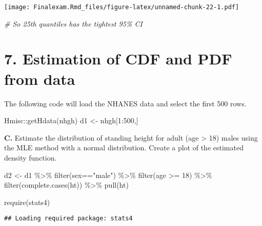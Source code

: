 \documentclass[
]{article}
\newenvironment{Shaded}{\begin{snugshade}}{\end{snugshade}}
\newcommand{\CommentTok}[1]{\textcolor[rgb]{0.56,0.35,0.01}{\textit{#1}}}
\newcommand{\DecValTok}[1]{\textcolor[rgb]{0.00,0.00,0.81}{#1}}
\newcommand{\FunctionTok}[1]{\textcolor[rgb]{0.00,0.00,0.00}{#1}}
\newcommand{\NormalTok}[1]{#1}
\newcommand{\OtherTok}[1]{\textcolor[rgb]{0.56,0.35,0.01}{#1}}
\newcommand{\SpecialCharTok}[1]{\textcolor[rgb]{0.00,0.00,0.00}{#1}}
\newcommand{\StringTok}[1]{\textcolor[rgb]{0.31,0.60,0.02}{#1}}
\begin{document}
\texttt{[image: Finalexam.Rmd\_files/figure-latex/unnamed-chunk-22-1.pdf]}

\begin{Shaded}
\begin{Highlighting}[]
\CommentTok{\# So 25th quantiles has the tightest 95\% CI}
\end{Highlighting}
\end{Shaded}

\hypertarget{estimation-of-cdf-and-pdf-from-data}{%
\section{7. Estimation of CDF and PDF from
data}\label{estimation-of-cdf-and-pdf-from-data}}

The following code will load the NHANES data and select the first 500
rows.

\begin{Shaded}
\begin{Highlighting}[]
\NormalTok{Hmisc}\SpecialCharTok{::}\FunctionTok{getHdata}\NormalTok{(nhgh)}
\NormalTok{d1 }\OtherTok{\textless{}{-}}\NormalTok{ nhgh[}\DecValTok{1}\SpecialCharTok{:}\DecValTok{500}\NormalTok{,]}
\end{Highlighting}
\end{Shaded}

\textbf{C.} Estimate the distribution of standing height for adult (age
\textgreater{} 18) males using the MLE method with a normal
distribution. Create a plot of the estimated density function.

\begin{Shaded}
\begin{Highlighting}[]
\NormalTok{d2 }\OtherTok{\textless{}{-}}\NormalTok{ d1 }\SpecialCharTok{\%\textgreater{}\%} 
  \FunctionTok{filter}\NormalTok{(sex}\SpecialCharTok{==}\StringTok{"male"}\NormalTok{) }\SpecialCharTok{\%\textgreater{}\%} 
  \FunctionTok{filter}\NormalTok{(age }\SpecialCharTok{\textgreater{}=} \DecValTok{18}\NormalTok{) }\SpecialCharTok{\%\textgreater{}\%} 
  \FunctionTok{filter}\NormalTok{(}\FunctionTok{complete.cases}\NormalTok{(ht)) }\SpecialCharTok{\%\textgreater{}\%} 
  \FunctionTok{pull}\NormalTok{(ht)}


\FunctionTok{require}\NormalTok{(stats4)}
\end{Highlighting}
\end{Shaded}

\begin{verbatim}
## Loading required package: stats4
\end{verbatim}
\end{document}
